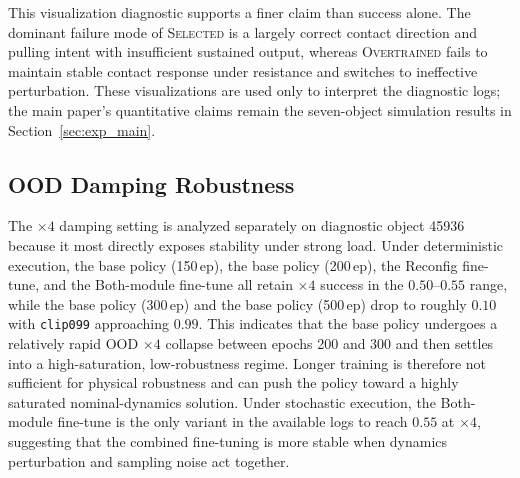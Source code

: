 \documentclass{llmxive}
\begin{document}
This visualization diagnostic supports a finer claim than success
alone. The dominant failure mode of \textsc{Selected} is a largely
correct contact direction and pulling intent with insufficient
sustained output, whereas \textsc{Overtrained} fails to maintain stable
contact response under resistance and switches to ineffective
perturbation. These visualizations are used only to interpret the
diagnostic logs; the main paper's quantitative claims remain the
seven-object simulation results in Section~\ref{sec:exp_main}.


\subsection{OOD Damping Robustness}
\label{sec:ood}

The $\times4$ damping setting is analyzed separately on diagnostic
object 45936 because it most directly exposes stability under strong load.
Under deterministic
execution, the base policy (150\,ep), the base policy (200\,ep),
the Reconfig fine-tune, and the Both-module fine-tune all retain
$\times4$ success in the $0.50$--$0.55$ range, while
the base policy (300\,ep) and the base policy (500\,ep) drop to
roughly $0.10$ with \texttt{clip099} approaching $0.99$. This
indicates that the base policy undergoes a relatively rapid OOD $\times4$
collapse between epochs 200 and 300 and then settles into a
high-saturation, low-robustness regime. Longer training is therefore
not sufficient for physical robustness and can push the policy
toward a highly saturated nominal-dynamics solution. Under
stochastic execution, the Both-module fine-tune is the only variant in
the available logs to reach $0.55$ at $\times4$, suggesting that the
combined fine-tuning is more stable when dynamics perturbation and
sampling noise act together.
\end{document}
